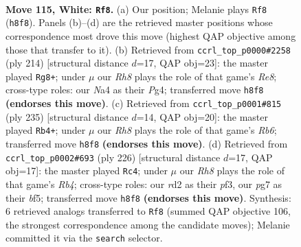 \documentclass[11pt]{article}
\begin{document}
\begin{figure}[p]\centering
\begin{subfigure}{0.46\textwidth}\centering
\resizebox{\linewidth}{!}{%
\newchessgame
\chessboard[
  setfen={7R/6p1/5pk1/7p/N6P/6PK/3r4/8 w - - 54 115},
  showmover=false,
  pgfstyle=straightmove, color=movearrow, markmove={h8-f8}
]}
\caption{}
\end{subfigure}\hfill
\begin{subfigure}{0.46\textwidth}\centering
\resizebox{\linewidth}{!}{%
\newchessgame
\chessboard[
  setfen={4R3/8/6k1/1r2p1p1/5pP1/5P2/4PK2/8 w - - 18 108},
  showmover=false,
  pgfstyle=straightmove, color=movearrow, markmove={e8-g8}
]}
\caption{}
\end{subfigure}
\\[4pt]
\begin{subfigure}{0.46\textwidth}\centering
\resizebox{\linewidth}{!}{%
\newchessgame
\chessboard[
  setfen={8/5pk1/5p2/2R4P/5KP1/1r3P2/8/8 b - - 70 118},
  showmover=false,
  pgfstyle=straightmove, color=movearrow, markmove={b3-b4}
]}
\caption{}
\end{subfigure}\hfill
\begin{subfigure}{0.46\textwidth}\centering
\resizebox{\linewidth}{!}{%
\newchessgame
\chessboard[
  setfen={8/8/8/5bpk/1R4p1/5pP1/7P/6K1 w - - 38 114},
  showmover=false,
  pgfstyle=straightmove, color=movearrow, markmove={b4-c4}
]}
\caption{}
\end{subfigure}
\caption{\textbf{Move 115, White: \texttt{Rf8}.} (a) Our position; Melanie plays \texttt{Rf8} (\texttt{h8f8}). Panels (b)--(d) are the retrieved master positions whose correspondence most drove this move (highest QAP objective among those that transfer to it). (b) Retrieved from \texttt{ccrl\_top\_p0000\#2258} (ply 214) [structural distance $d$=17, QAP obj=23]: the master played \texttt{Rg8+}; under $\mu$ our \emph{Rh8} plays the role of that game's \emph{Re8}; cross-type roles: our \emph{N}a4 as their \emph{P}g4; transferred move \texttt{h8f8} \textbf{(endorses this move)}. (c) Retrieved from \texttt{ccrl\_top\_p0001\#815} (ply 235) [structural distance $d$=14, QAP obj=20]: the master played \texttt{Rb4+}; under $\mu$ our \emph{Rh8} plays the role of that game's \emph{Rb6}; transferred move \texttt{h8f8} \textbf{(endorses this move)}. (d) Retrieved from \texttt{ccrl\_top\_p0002\#693} (ply 226) [structural distance $d$=17, QAP obj=17]: the master played \texttt{Rc4}; under $\mu$ our \emph{Rh8} plays the role of that game's \emph{Rb4}; cross-type roles: our \emph{r}d2 as their \emph{p}f3, our \emph{p}g7 as their \emph{b}f5; transferred move \texttt{h8f8} \textbf{(endorses this move)}. Synthesis: 6 retrieved analogs transferred to \texttt{Rf8} (summed QAP objective 106, the strongest correspondence among the candidate moves); Melanie committed it via the \texttt{search} selector.}
\label{fig:thought-m228}
\end{figure}
\end{document}
